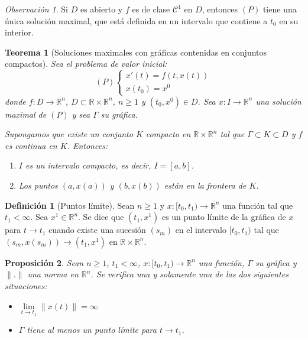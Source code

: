 \documentclass{report}
\newtheorem{theorem}{Teorema}[chapter]
\newtheorem{proposition}[theorem]{Proposición}
\theoremstyle{remark}
\newtheorem*{remark}{Observación}
\theoremstyle{remark}
\theoremstyle{remark}
\theoremstyle{definition}
\newtheorem{definition}{Definición}[chapter]
\theoremstyle{definition}
\theoremstyle{definition}
\begin{document}
\begin{remark}
    Si $D$ es abierto y $f$ es de clase $\mathcal{C}^1$ en $D$, entonces $(P)$ tiene una única solución maximal, que está definida en un intervalo que contiene a $t_0$ en su interior.
\end{remark}

\begin{theorem}[Soluciones maximales con gráficas contenidas en conjuntos compactos]
    Sea el problema de valor inicial:
    $$(P) \begin{cases}
            x'(t) = f(t, x(t)) \\
            x(t_0) = x^0
        \end{cases}$$
    donde $f: D \to \mathbb{R}^n$, $D \subset \mathbb{R} \times \mathbb{R}^n$, $n \geq 1$ y $(t_0, x^0) \in D$.
    Sea $x: I \to \mathbb{R}^n$ una solución maximal de $(P)$ y sea $\Gamma$ su gráfica.

    Supongamos que existe un conjunto $K$ compacto en $\mathbb{R} \times \mathbb{R}^n$ tal que $\Gamma \subset K \subset D$ y $f$ es continua en $K$.
    Entonces:
    \begin{enumerate}
        \item $I$ es un intervalo compacto, es decir, $I = [a, b]$.
        \item Los puntos $(a, x(a))$ y $(b, x(b))$ están en la frontera de $K$.
    \end{enumerate}
\end{theorem}

\begin{definition}[Puntos límite]
    Sean $n \geq 1$ y $x: [t_0, t_1) \to \mathbb{R}^n$ una función tal que $t_1 < \infty$.
    Sea $x^1 \in \mathbb{R}^n$.
    Se dice que $(t_1, x^1)$ es un punto límite de la gráfica de $x$ para $t \to t_1$ cuando existe una sucesión $(s_m)$ en el intervalo $[t_0, t_1)$ tal que $(s_m, x(s_m)) \to (t_1, x^1)$ en $\mathbb{R} \times \mathbb{R}^n$.
\end{definition}

\begin{proposition}
    Sean $n \geq 1$, $t_1 < \infty$, $x: [t_0, t_1) \to \mathbb{R}^n$ una función, $\Gamma$ su gráfica y $\|.\|$ una norma en $\mathbb{R}^n$.
    Se verifica una y solamente una de las dos siguientes situaciones:
    \begin{itemize}
        \item $\lim\limits_{t \to t_1} \|x(t)\| = \infty$
        \item $\Gamma$ tiene al menos un punto límite para $t \to t_1$.
    \end{itemize}
\end{proposition}
\end{document}
